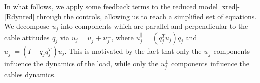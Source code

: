 \documentclass[letterpaper, 10 pt, conference]{ieeeconf}  %
\newcounter{part} %
\begin{document}


In what follows, we apply some feedback terms to the reduced model \eqref{xred}-\eqref{Rdynred} through the controls, allowing us to reach a simplified set of equations. We decompose $u_j$ into components which are parallel and perpendicular to the cable attitudes $q_j$ via $u_j = u_j^{\parallel} + u_j^{\perp}$, where $u_j^{\parallel} = (q_j^T u_j)q_j$ and $u_j^{\perp} = (I - q_j q_j^T)u_j$. This is motivated by the fact that only the $u_j^{\parallel}$ components influence the dynamics of the load, while only the $u_j^{\perp}$ components influence the cables dynamics.%

\end{document}
